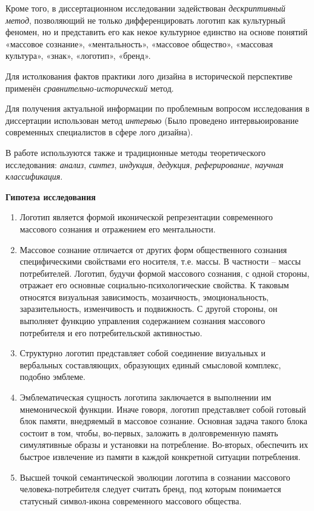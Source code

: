 Кроме того, в диссертационном исследовании задействован \emph{дескриптивный метод}, позволяющий не только дифференцировать логотип как культурный феномен, но и представить его как некое культурное единство на основе понятий «массовое сознание», «ментальность», «массовое общество», «массовая культура», «знак», «логотип», «бренд».

Для истолкования фактов практики лого дизайна в исторической перспективе применён \emph {сравнительно-исторический} метод.

Для получения актуальной информации по проблемным вопросом исследования в диссертации использован метод \emph{интервью} (Было проведено интервьюирование современных специалистов в сфере лого дизайна).

В работе используются также и традиционные методы теоретического исследования: \emph{анализ}, \emph{синтез}, \emph{индукция}, \emph{дедукция}, \emph{реферирование}, \emph{научная классификация}.

\textbf{Гипотеза исследования}
\begin{enumerate}
\item Логотип является формой иконической репрезентации современного массового сознания и отражением его ментальности.
\item Массовое сознание отличается от других форм общественного сознания специфическими свойствами его носителя, т.е. массы. В частности – массы потребителей. Логотип, будучи формой массового сознания, с одной стороны, отражает его основные социально-психологические свойства. К таковым относятся визуальная зависимость, мозаичность, эмоциональность, заразительность, изменчивость и подвижность. С другой стороны, он выполняет функцию управления содержанием сознания массового потребителя и его потребительской активностью. 
\item Структурно логотип представляет собой соединение визуальных и вербальных составляющих, образующих единый смысловой комплекс, подобно эмблеме. 
\item Эмблематическая сущность логотипа заключается в выполнении им мнемонической функции. Иначе говоря, логотип представляет собой готовый блок памяти, внедряемый в массовое сознание. Основная задача такого блока состоит в том, чтобы, во-первых, заложить в долговременную память симулятивные образы и установки на потребление. Во-вторых, обеспечить их быстрое извлечение из памяти в каждой конкретной ситуации потребления.
\item Высшей точкой семантической эволюции логотипа в сознании массового человека-потребителя следует считать бренд, под которым понимается статусный символ-икона современного массового общества.
\end{enumerate}

